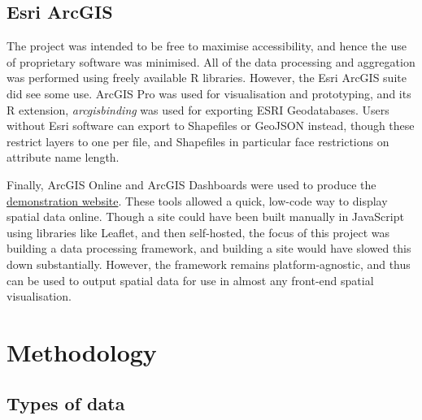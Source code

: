 \documentclass[12pt,a4paper]{article}
\begin{document}
\subsection{Esri ArcGIS}

The project was intended to be free to maximise accessibility, and hence the use of proprietary software was minimised. All of the data processing and aggregation was performed using freely available R libraries. However, the Esri ArcGIS suite \citep{esri:2021} did see some use. ArcGIS Pro was used for visualisation and prototyping, and its R extension, \emph{arcgisbinding} was used for exporting ESRI Geodatabases. Users without Esri software can export to Shapefiles or GeoJSON instead, though these restrict layers to one per file, and Shapefiles in particular face restrictions on attribute name length.

Finally, ArcGIS Online and ArcGIS Dashboards were used to produce the \href{https://www.arcgis.com/apps/dashboards/2e46471d956347bcb0a1de8465ad31d7}{demonstration website}. These tools allowed a quick, low-code way to display spatial data online. Though a site could have been built manually in JavaScript using libraries like Leaflet, and then self-hosted, the focus of this project was building a data processing framework, and building a site would have slowed this down substantially. However, the framework remains platform-agnostic, and thus can be used to output spatial data for use in almost any front-end spatial visualisation.

\section{Methodology}
\label{sec:methodology}

\subsection{Types of data}
\label{sec:types}
\end{document}
